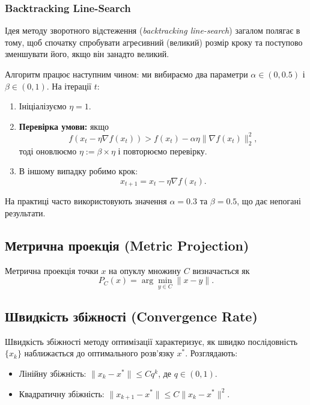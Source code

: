 \documentclass[a4paper,12pt]{article}
\begin{document}
\subsubsection{Backtracking Line-Search}

Ідея методу зворотного відстеження (\textit{backtracking line-search}) загалом полягає в тому, щоб спочатку спробувати агресивний (великий) розмір кроку та поступово зменшувати його, якщо він занадто великий.

Алгоритм працює наступним чином: ми вибираємо два параметри $\alpha \in (0, 0.5)$ і $\beta \in (0, 1)$. На ітерації $t$:

\begin{enumerate}
    \item Ініціалізуємо $\eta = 1$.
    \item \textbf{Перевірка умови:} якщо 
    \[
    f(x_t - \eta \nabla f(x_t)) > f(x_t) - \alpha \eta \|\nabla f(x_t)\|_2^2,
    \]
    тоді оновлюємо $\eta := \beta \times \eta$ і повторюємо перевірку.
    \item В іншому випадку робимо крок:
    \[
    x_{t+1} = x_t - \eta \nabla f(x_t).
    \]
\end{enumerate}

На практиці часто використовують значення $\alpha = 0.3$ та $\beta = 0.5$, що дає непогані результати.



\subsection{Метрична проекція (Metric Projection)}
Метрична проекція точки $x$ на опуклу множину $C$ визначається як
\begin{equation}
    P_C(x) = \arg\min_{y \in C} \|x - y\|.
\end{equation}

\subsection{Швидкість збіжності (Convergence Rate)} Швидкість збіжності методу оптимізації характеризує, як швидко послідовність $\{x_k\}$ наближається до оптимального розв’язку $x^*$. Розглядають:
\begin{itemize}
    \item Лінійну збіжність: $\|x_k - x^*\| \leq C q^k$, де $q \in (0,1)$.
    \item Квадратичну збіжність: $\|x_{k+1} - x^*\| \leq C \|x_k - x^*\|^2$.
\end{itemize}
\end{document}
